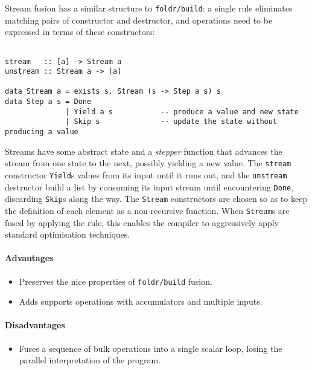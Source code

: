Stream fusion has a similar structure to \texttt{foldr/build}: a single rule
eliminates matching pairs of constructor and destructor, and operations need to
be expressed in terms of these constructors:
%
\begin{lstlisting}[style=Haskell,numbers=none,mathescape,caption={The \emph{stream fusion} transformation}]
%\bf$\langle$ stream fusion $\rangle$% forall s. stream (unstream s) $\mapsto$ s

stream   :: [a] -> Stream a
unstream :: Stream a -> [a]

data Stream a = exists s. Stream (s -> Step a s) s
data Step a s = Done
              | Yield a s           -- produce a value and new state
              | Skip s              -- update the state without producing a value
\end{lstlisting}

Streams have some abstract state and a \emph{stepper} function that advances the
stream from one state to the next, possibly yielding a new value. The
\texttt{stream} constructor \texttt{Yield}s values from its input until it runs
out, and the \texttt{unstream} destructor build a list by consuming its input
stream until encountering \texttt{Done}, discarding \texttt{Skip}s along the
way. The \texttt{Stream} constructors are chosen so as to keep the definition of
each element as a non-recursive function. When \texttt{Stream}s are fused by
applying the rule, this enables the compiler to aggressively apply standard
optimisation techniques.

\paragraph{Advantages}
\begin{itemize}
    \item Preserves the nice properties of
        \texttt{foldr/build} fusion.
    \item Adds supports operations with accumulators and multiple inputs.
\end{itemize}

\paragraph{Disadvantages}
\begin{itemize}
    \item Fuses a sequence of bulk operations into a single scalar loop, losing
        the parallel interpretation of the program.
\end{itemize}


